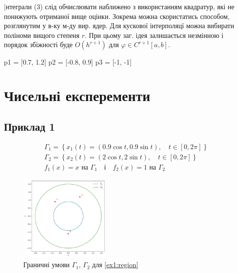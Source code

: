 \documentclass[14pt,a4paper]{extarticle}
\newcounter{e}
\numberwithin{equation}{section}
\begin{document}
 |нтеграли (3) слід обчислювати наближено з використанням квадратур, які не понижують отриманої вище оцінки. Зокрема можна скористатись способом, розглянутим у в-ку м-ду вир. ядер.
 Для кускової інтерполяцї можна вибирати поліноми вищого степеня $r .$ При цьому заг. ідея залишається незмінною і порядок збіжності буде $O\left(h^{r+1}\right)$ для $\varphi \in C^{r+1}[a, b] .$
 
 
 p1 = [0.7, 1.2]
 p2 = [-0.8, 0.9]
 p3 = [-1, -1]
 \newpage
 \thispagestyle{empty}
 \section{Чисельні експеременти}
\subsection{Приклад 1}

	\begin{equation}
		\label{ex1}
		\begin{array}{l}
			\displaystyle
			\Gamma_{1}=\left\{x_{1}(t)=(0.9 \cos t, 0.9 \sin t), \quad t \in[0,2 
			\pi]\right\} \\
			
			\displaystyle
			\Gamma_{2}=\left\{x_{2}(t)=(2 \cos t, 2 \sin t), \quad  t \in[0,2 \pi]\right\} \\[0.1cm]
			
			\displaystyle
			f_{1}(x)=x  \text { на } \Gamma_{1} \quad \text {і} \quad
			f_{2}(x)=1  \text { на } \Gamma_{2}
		\end{array}
	\end{equation}




  
  \begin{figure}[h]
  	\includegraphics[width=0.4\textwidth]{resources/curves_and_points.pdf}
  	\centering
  	\caption{Граничні умови $\Gamma_1$, $\Gamma_2$ для \ref{ex1:region}}
  \end{figure}
\end{document}
